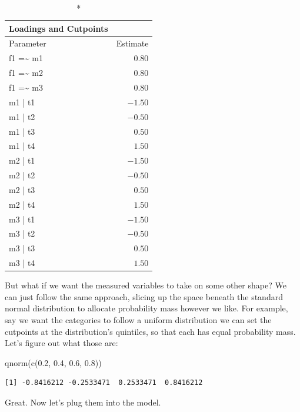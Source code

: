 \documentclass[
  letterpaper,
  DIV=11,
  numbers=noendperiod]{scrreprt}
\newenvironment{Shaded}{\begin{snugshade}}{\end{snugshade}}
\newcommand{\FloatTok}[1]{\textcolor[rgb]{0.68,0.00,0.00}{#1}}
\newcommand{\FunctionTok}[1]{\textcolor[rgb]{0.28,0.35,0.67}{#1}}
\newcommand{\NormalTok}[1]{\textcolor[rgb]{0.00,0.23,0.31}{#1}}
\begin{document}
\begin{longtable}{lr}
\caption*{
{\large Loadings and Cutpoints}
} \\ 
\toprule
Parameter & Estimate \\ 
\midrule
f1 =\textasciitilde{} m1 & $0.80$ \\ 
f1 =\textasciitilde{} m2 & $0.80$ \\ 
f1 =\textasciitilde{} m3 & $0.80$ \\ 
m1 | t1 & $-1.50$ \\ 
m1 | t2 & $-0.50$ \\ 
m1 | t3 & $0.50$ \\ 
m1 | t4 & $1.50$ \\ 
m2 | t1 & $-1.50$ \\ 
m2 | t2 & $-0.50$ \\ 
m2 | t3 & $0.50$ \\ 
m2 | t4 & $1.50$ \\ 
m3 | t1 & $-1.50$ \\ 
m3 | t2 & $-0.50$ \\ 
m3 | t3 & $0.50$ \\ 
m3 | t4 & $1.50$ \\ 
\bottomrule
\end{longtable}

But what if we want the measured variables to take on some other shape?
We can just follow the same approach, slicing up the space beneath the
standard normal distribution to allocate probability mass however we
like. For example, say we want the categories to follow a uniform
distribution we can set the cutpoints at the distribution's quintiles,
so that each has equal probability mass. Let's figure out what those
are:

\begin{Shaded}
\begin{Highlighting}[]
\FunctionTok{qnorm}\NormalTok{(}\FunctionTok{c}\NormalTok{(}\FloatTok{0.2}\NormalTok{, }\FloatTok{0.4}\NormalTok{, }\FloatTok{0.6}\NormalTok{, }\FloatTok{0.8}\NormalTok{))}
\end{Highlighting}
\end{Shaded}

\begin{verbatim}
[1] -0.8416212 -0.2533471  0.2533471  0.8416212
\end{verbatim}

Great. Now let's plug them into the model.
\end{document}
